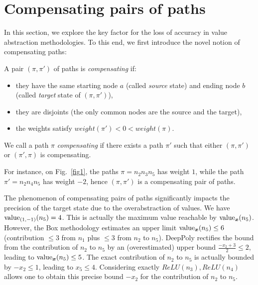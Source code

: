 
\section{Compensating pairs of paths}
\label{Sec.comp}

In this section, we explore the key factor for the loss of accuracy in value 
abstraction methodologies. To this end, we first introduce the novel notion of compensating paths:

\begin{definition}
A pair $(\pi,\pi')$ of paths is {\em compensating} if:
\begin{itemize}
	\item they have the same starting node $a$ (called {\em source} state) and ending node $b$ (called {\em target} state of $(\pi,\pi')$),
	\item they are disjoints (the only common nodes are the source and the target),
	\item the weights satisfy $weight(\pi') < 0 < weight(\pi)$.
\end{itemize}	
We call a path $\pi$ {\em compensating} if there exists a path $\pi'$ such that either $(\pi,\pi')$ or $(\pi',\pi)$ is compensating.
\end{definition}

\begin{example}
	For instance, on Fig.~\ref{fig1}, the paths $\pi= n_2 n_3 n_5$ has weight $1$, while the
	path $\pi'= n_2 n_4 n_5$ has weight $-2$, hence $(\pi,\pi')$ is a compensating pair of paths.
	\end{example}


The phenomenon of compensating pairs of paths significantly impacts the precision of the target state due to the overabstraction of values. We have ${\textrm{value}}_{(1,-1)}(n_5)=4$. 
This is actually the maximum value reachable by ${\textrm{value}}_{\boldsymbol{x}}(n_5)$. However, the Box methodology estimates an upper limit ${\textrm{value}}_{\boldsymbol{x}}(n_5) \leq 6$ (contribution $\leq 3$ from $n_1$ plus $\leq 3$ from $n_2$ to $n_5$). 
DeepPoly rectifies the bound from the contribution of $n_2$ to $n_5$ by an (overestimated) upper bound $\frac{-x_2+3}{2} \leq 2$, leading to ${\textrm{value}}_{\boldsymbol{x}}(n_5) \leq 5$. 
The exact contribution of $n_2$ to $n_5$ is actually bounded by $-x_2 \leq 1$, leading to $x_5 \leq 4$. Considering exactly $ReLU(n_3),ReLU(n_4)$ allows one to obtain 
this precise bound $-x_2$ for the contribution of $n_2$ to $n_5$.

